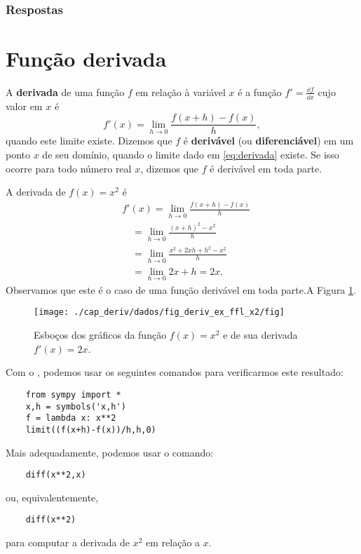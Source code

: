 \ifisbook
\subsubsection{Respostas}
\shipoutAnswer
\fi


\section{Função derivada}\label{cap_deriv_sec_funder}

A {\bf derivada} de uma função $f$ em relação à variável $x$ é a função $\displaystyle f' = \frac{\dd f}{\dd x}$ cujo valor em $x$ é
\begin{equation}\label{eq:derivada}
  f'(x) = \lim_{h\to 0} \frac{f(x+h)-f(x)}{h},
\end{equation}
quando este limite existe. Dizemos que $f$ é {\bf derivável} (ou {\bf diferenciável}) em um ponto $x$ de seu domínio, quando o limite dado em \eqref{eq:derivada} existe. Se isso ocorre para todo número real $x$, dizemos que $f$ é derivável em toda parte.

\begin{ex}
  A derivada de $f(x) = x^2$ é
  \begin{align}
    & f'(x) = \lim_{h\to 0} \frac{f(x+h)-f(x)}{h}\\
    & \text{}\quad = \lim_{h\to 0} \frac{(x+h)^2 - x^2}{h}\\
    & \text{}\quad = \lim_{h\to 0} \frac{x^2+2xh+h^2-x^2}{h}\\
    & \text{}\quad = \lim_{h\to 0} 2x+h = 2x.
  \end{align}
  Observamos que este é o caso de uma função derivável em toda parte.A Figura \ref{fig:deriv_ex_ffl_x2}.

  \begin{figure}[H]
    \centering
    \texttt{[image: ./cap\_deriv/dados/fig\_deriv\_ex\_ffl\_x2/fig]}
    \caption{Esboços dos gráficos da função $f(x)=x^2$ e de sua derivada $f'(x) = 2x$.}
    \label{fig:deriv_ex_ffl_x2}
  \end{figure}  
  
  \ifispython
  Com o \sympy, podemos usar os seguintes comandos para verificarmos este resultado:
  \begin{lstlisting}
    from sympy import *
    x,h = symbols('x,h')
    f = lambda x: x**2
    limit((f(x+h)-f(x))/h,h,0)
  \end{lstlisting}

  Mais adequadamente, podemos usar o comando:
  \begin{lstlisting}
    diff(x**2,x)
  \end{lstlisting}
  ou, equivalentemente,
  \begin{lstlisting}
    diff(x**2)
  \end{lstlisting}
  para computar a derivada de $x^2$ em relação a $x$.
  \fi
\end{ex}

